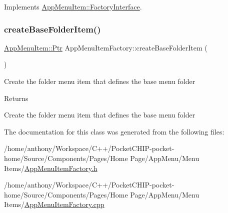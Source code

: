 Implements \mbox{\hyperlink{classAppMenuItem_1_1FactoryInterface_a3b9ef458047ad7c8c5bbae6157466f6c}{App\+Menu\+Item\+::\+Factory\+Interface}}.

\mbox{\label{classAppMenuItemFactory_ab4e1c1019c09f110ff17091a45c918f0}} 
\subsubsection{\texorpdfstring{create\+Base\+Folder\+Item()}{createBaseFolderItem()}}
{\footnotesize\ttfamily \mbox{\hyperlink{classAppMenuItem_ab5f51c5d74f8df62b8862c0cc8126cb7}{App\+Menu\+Item\+::\+Ptr}} App\+Menu\+Item\+Factory\+::create\+Base\+Folder\+Item (\begin{DoxyParamCaption}{ }\end{DoxyParamCaption})}

Create the folder menu item that defines the base menu folder \begin{DoxyReturn}{Returns}

\end{DoxyReturn}
Create the folder menu item that defines the base menu folder 

The documentation for this class was generated from the following files\+:\begin{DoxyCompactItemize}
\item 
/home/anthony/\+Workspace/\+C++/\+Pocket\+C\+H\+I\+P-\/pocket-\/home/\+Source/\+Components/\+Pages/\+Home Page/\+App\+Menu/\+Menu Items/\mbox{\hyperlink{AppMenuItemFactory_8h}{App\+Menu\+Item\+Factory.\+h}}\item 
/home/anthony/\+Workspace/\+C++/\+Pocket\+C\+H\+I\+P-\/pocket-\/home/\+Source/\+Components/\+Pages/\+Home Page/\+App\+Menu/\+Menu Items/\mbox{\hyperlink{AppMenuItemFactory_8cpp}{App\+Menu\+Item\+Factory.\+cpp}}\end{DoxyCompactItemize}
